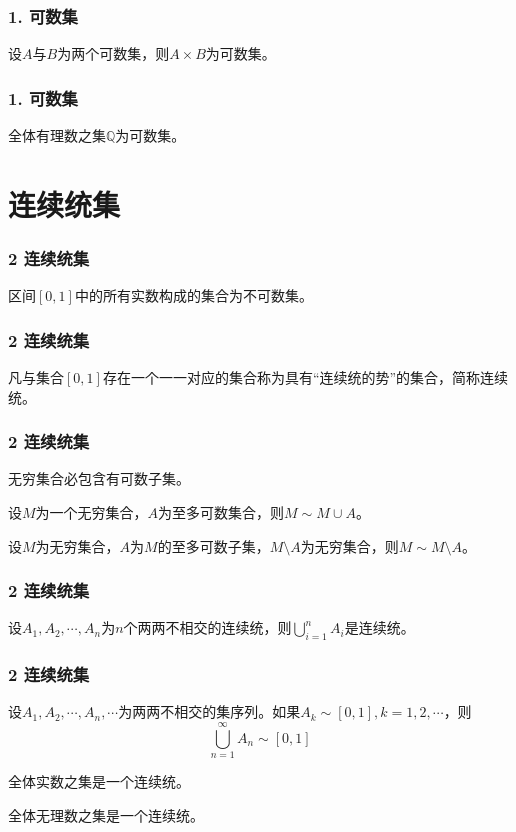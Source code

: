 \documentclass{beamer}
\begin{document}
\begin{CJK*}{UTF8}{gbsn}
\begin{frame}
  \frametitle{1. 可数集}
  \begin{Thm}
    设$A$与$B$为两个可数集，则$A\times B$为可数集。
  \end{Thm}
\end{frame}

\begin{frame}
  \frametitle{1. 可数集}
  \begin{Thm}
    全体有理数之集$\mathbb{Q}$为可数集。
  \end{Thm}
\end{frame}


\section{连续统集}
\begin{frame}
  \frametitle{2 连续统集}
  \begin{Thm}
    区间$[0,1]$中的所有实数构成的集合为不可数集。
  \end{Thm}
\end{frame}

\begin{frame}
  \frametitle{2 连续统集}
  \begin{Def}
    凡与集合$[0,1]$存在一个一一对应的集合称为具有“连续统的势”的集合，简称\alert{连续统}。
  \end{Def}
\end{frame}

\begin{frame}
  \frametitle{2 连续统集}
  \begin{Thm}
    无穷集合必包含有可数子集。
  \end{Thm}\pause
  \begin{Thm}
    设$M$为一个无穷集合，$A$为至多可数集合，则$M \sim M \cup A$。
  \end{Thm}\pause
  \begin{Thm}
    设$M$为无穷集合，$A$为$M$的至多可数子集，$M\setminus A$为无穷集合，则$M \sim M\setminus A$。
  \end{Thm}
\end{frame}
\begin{frame}
  \frametitle{2 连续统集}
  \begin{Thm}
    设$A_1, A_2, \cdots, A_n$为$n$个两两不相交的连续统，则$\bigcup_{i=1}^nA_i$是连续统。
  \end{Thm}
\end{frame}

\begin{frame}
  \frametitle{2 连续统集}
  \begin{Thm}
    设$A_1, A_2, \cdots, A_n, \cdots$为两两不相交的集序列。如果$A_k \sim [0,1], k = 1, 2, \cdots$，则
    \[\bigcup_{n=1}^{\infty}A_n \sim [0,1]\]
  \end{Thm}
  \begin{Cor}
    全体实数之集是一个连续统。
  \end{Cor}
  \begin{Cor}
    全体无理数之集是一个连续统。
  \end{Cor}
\end{frame}


\end{CJK*}
\end{document}
